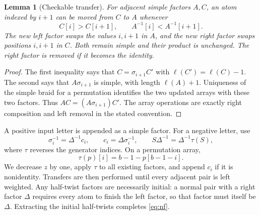 \documentclass[11pt,a4paper]{article}
\newtheorem{lemma}[theorem]{Lemma}
\theoremstyle{definition}\newtheorem{definition}[theorem]{Definition}
\theoremstyle{remark}\newtheorem{remark}[theorem]{Remark}
\begin{document}
\begin{lemma}[Checkable transfer]\label{lem:transfer}
For adjacent simple factors $A,C$, an atom indexed by $i+1$ can be moved from
$C$ to $A$ whenever
\[
 C[i]>C[i+1],\qquad A^{-1}[i]<A^{-1}[i+1].
\]
The new left factor swaps the \emph{values} $i,i+1$ in $A$, and the new right
factor swaps \emph{positions} $i,i+1$ in $C$. Both remain simple and their
product is unchanged. The right factor is removed if it becomes the identity.
\end{lemma}
\begin{proof}
The first inequality says that $C=\sigma_{i+1}C'$ with
$\ell(C')=\ell(C)-1$. The second says that $A\sigma_{i+1}$ is simple,
with length $\ell(A)+1$. Uniqueness of the simple braid for a permutation
identifies the two updated arrays with these two factors. Thus
$AC=(A\sigma_{i+1})C'$. The array operations are exactly right composition
and left removal in the stated convention.
\end{proof}

A positive input letter is appended as a simple factor. For a negative letter,
use
\[
 \sigma_i^{-1}=\Delta^{-1}c_i,\qquad c_i=\Delta\sigma_i^{-1},
 \qquad S\Delta^{-1}=\Delta^{-1}\tau(S),
\]
where $\tau$ reverses the generator indices. On a permutation array,
\[
 \tau(p)[i]=b-1-p[b-1-i].
\]
We decrease $z$ by one, apply $\tau$ to all existing factors, and append $c_i$
if it is nonidentity. Transfers are then performed until every adjacent pair
is left weighted. Any half-twist factors are necessarily initial: a normal
pair with a right factor $\Delta$ requires every atom to finish the left
factor, so that factor must itself be $\Delta$. Extracting the initial
half-twists completes \eqref{eq:nf}.
\end{document}
